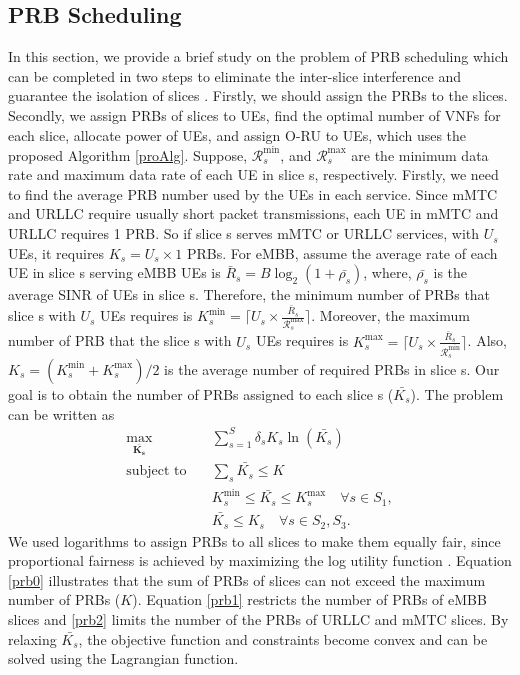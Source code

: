 \documentclass[lettersize,journal]{IEEEtran}
\begin{document}
\subsection{PRB Scheduling}\label{prb}
In this section, we provide a brief study on the problem of PRB scheduling which can be completed in two steps to eliminate the inter-slice interference and guarantee the isolation of slices \cite{marabissi2019highly}.
Firstly, we should assign the PRBs to the slices. Secondly, we assign PRBs of slices to UEs, find the optimal number of VNFs for each slice, allocate power of UEs, and assign O-RU to UEs, which uses the proposed Algorithm \ref{proAlg}.
Suppose, $\mathcal{R}_{{s}}^{\min}$, and $\mathcal{R}_{{s}}^{\text{max}}$ are the minimum data rate and maximum data rate of each UE in slice s, respectively.
Firstly, we need to find the average PRB number used by the UEs in each service. Since mMTC and URLLC require usually short packet transmissions, each UE in mMTC and URLLC requires 1 PRB. So if slice s serves mMTC or URLLC services, with $U_s$ UEs, it requires $K_s = U_s \times 1$ PRBs. For eMBB, assume the average rate of each UE in slice s serving eMBB UEs is $\bar{R}_s = B\log_2(1 + \bar{\rho_s})$, where, $\bar{\rho_s}$ is the average SINR of UEs in slice s. 
Therefore, the minimum number of PRBs that slice s with $U_s$ UEs requires is $K_s^{\min} = \lceil{U_s \times \frac{\bar{R}_s}{\mathcal{R}_{{s}}^{\text{max}}}}\rceil$. 
Moreover, the maximum number of PRB that the slice s with $U_s$ UEs requires is $K_s^{\text{max}} = \lceil{U_s \times \frac{\bar{R}_s}{\mathcal{R}_{{s}}^{\min}}}\rceil$. Also, $K_s = (K_s^{\min}+K_s^{\text{max}})/2$ is the average number of required PRBs in slice s.
Our goal is to obtain the number of PRBs assigned to each slice s ($\bar{K_s}$).
The problem can be written as
\begin{subequations}\label{prob:prb}
\begin{alignat}{4}
\max\limits_{\boldsymbol{\bar{K_s}}} \quad &  \sum_{s=1}^{S}\delta_s K_s \ln(\bar{K_s}) \ \\
\text{subject to} \quad  & \sum_s{\bar{K_s}} \leq K
 \label{prb0} \\
& K_s^{\min} \leq \bar{K_s}  \leq K_s^{\text{max}}  \quad \forall s \in S_1,\label{prb1} \\
&  \bar{K_s} \leq K_s  \quad \forall s \in S_2, S_3.\label{prb2}
\end{alignat}
\label{constraints}
\end{subequations}
We used logarithms to assign PRBs to all slices to make them equally fair, since proportional fairness is achieved by maximizing the log utility function \cite{marabissi2019highly}.
Equation \eqref{prb0} illustrates that the sum of PRBs of slices can not exceed the maximum number of PRBs ($K$).
Equation \eqref{prb1} restricts the number of PRBs of eMBB slices and \eqref{prb2} limits the number of the PRBs of URLLC and mMTC slices. By relaxing $\bar{K_s}$, the objective function and constraints become convex and can be solved using the Lagrangian function.
\end{document}
